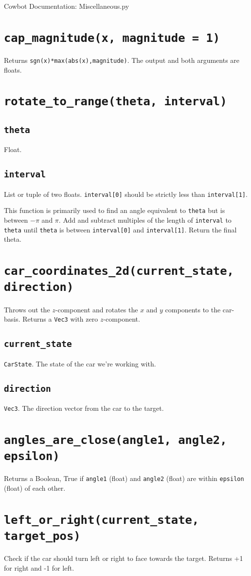 \documentclass{article}
\newcommand{\function}[1]{\section{\texttt{#1}}}
\newcommand{\argumenta}[1]{\subsection{\texttt{#1}}}
\begin{document}
\begin{flushleft}

\begin{center}
  Cowbot Documentation: Miscellaneous.py
\end{center}


\function{cap\_magnitude(x, magnitude = 1)}
         {
           Returns \texttt{sgn(x)*max(abs(x),magnitude)}.  The output and both arguments are floats.
                              
         }
         



\function{rotate\_to\_range(theta, interval)}
         {
           \argumenta{theta}
                    {
                      Float.
                    }
           \argumenta{interval}
                    {
                      List or tuple of two floats.  \texttt{interval[0]} should be strictly less than \texttt{interval[1]}.
                    }

           This function is primarily used to find an angle equivalent to \texttt{theta} but is between $-\pi$ and $\pi$.  Add and subtract multiples of the length of \texttt{interval} to \texttt{theta} until \texttt{theta} is between \texttt{interval[0]} and \texttt{interval[1]}. Return the final theta.
         }




\function{car\_coordinates\_2d(current\_state, direction)}
         {
           Throws out the $z$-component and rotates the $x$ and $y$ components to the car-basis.  Returns a \texttt{Vec3} with zero $z$-component.

           \argumenta{current\_state}
                     {
                       \texttt{CarState}.  The state of the car we're working with.
                     }
           \argumenta{direction}
                     {
                       \texttt{Vec3}.  The direction vector from the car to the target.
                     }
         }



\function{angles\_are\_close(angle1, angle2, epsilon)}
         {
           Returns a Boolean, True if \texttt{angle1} (float) and \texttt{angle2} (float) are within \texttt{epsilon} (float) of each other.
         }





\function{left\_or\_right(current\_state, target\_pos)}
         {
           Check if the car should turn left or right to face towards the target.  Returns +1 for right and -1 for left.

}
\end{flushleft}
\end{document}
